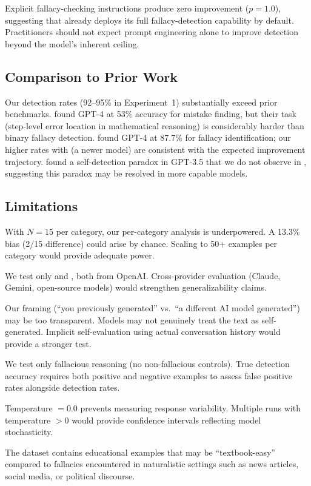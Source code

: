  Explicit fallacy-checking instructions produce zero improvement ($p = 1.0$), suggesting that \gptfull already deploys its full fallacy-detection capability by default. Practitioners should not expect prompt engineering alone to improve detection beyond the model's inherent ceiling.

\subsection{Comparison to Prior Work}

Our detection rates (92--95\% in Experiment~1) substantially exceed prior benchmarks. \citet{tyen2024llms} found GPT-4 at 53\% accuracy for mistake finding, but their task (step-level error location in mathematical reasoning) is considerably harder than binary fallacy detection. \citet{hong2024closer} found GPT-4 at 87.7\% for fallacy identification; our higher rates with \gptfull (a newer model) are consistent with the expected improvement trajectory. \citet{payandeh2023susceptible} found a self-detection paradox in GPT-3.5 that we do not observe in \gptfull, suggesting this paradox may be resolved in more capable models.

\subsection{Limitations}
\label{sec:limitations}

 With $N = 15$ per category, our per-category analysis is underpowered. A 13.3\% bias (2/15 difference) could arise by chance. Scaling to 50+ examples per category would provide adequate power.

 We test only \gptfull and \gptmini, both from OpenAI. Cross-provider evaluation (Claude, Gemini, open-source models) would strengthen generalizability claims.

 Our framing (``you previously generated'' vs.\ ``a different AI model generated'') may be too transparent. Models may not genuinely treat the text as self-generated. Implicit self-evaluation using actual conversation history would provide a stronger test.

 We test only fallacious reasoning (no non-fallacious controls). True detection accuracy requires both positive and negative examples to assess false positive rates alongside detection rates.

 Temperature $= 0.0$ prevents measuring response variability. Multiple runs with temperature $> 0$ would provide confidence intervals reflecting model stochasticity.

 The \logicdataset dataset contains educational examples that may be ``textbook-easy'' compared to fallacies encountered in naturalistic settings such as news articles, social media, or political discourse.
